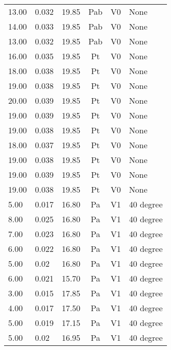 \begin{table}[b!]
\begin{tabular}{l | l | l | c | c | l}
13.00          & 0.032           & 19.85  & Pab      & V0     & None                \\
14.00          & 0.033           & 19.85  & Pab      & V0     & None                \\
13.00          & 0.032           & 19.85  & Pab      & V0     & None                \\
16.00          & 0.035           & 19.85  & Pt       & V0     & None                \\
18.00          & 0.038           & 19.85  & Pt       & V0     & None                \\
19.00          & 0.038           & 19.85  & Pt       & V0     & None                \\
20.00          & 0.039           & 19.85  & Pt       & V0     & None                \\
19.00          & 0.039           & 19.85  & Pt       & V0     & None                \\
19.00          & 0.038           & 19.85  & Pt       & V0     & None                \\
18.00          & 0.037           & 19.85  & Pt       & V0     & None                \\
19.00          & 0.038           & 19.85  & Pt       & V0     & None                \\
19.00          & 0.039           & 19.85  & Pt       & V0     & None                \\
19.00          & 0.038           & 19.85  & Pt       & V0     & None                \\
5.00           & 0.017           & 16.80  & Pa       & V1     & 40 degree           \\
8.00           & 0.025           & 16.80  & Pa       & V1     & 40 degree           \\
7.00           & 0.023           & 16.80  & Pa       & V1     & 40 degree           \\
6.00           & 0.022           & 16.80  & Pa       & V1     & 40 degree           \\
5.00           & 0.02            & 16.80  & Pa       & V1     & 40 degree           \\
6.00           & 0.021           & 15.70  & Pa       & V1     & 40 degree           \\
3.00           & 0.015           & 17.85  & Pa       & V1     & 40 degree           \\
4.00           & 0.017           & 17.50  & Pa       & V1     & 40 degree           \\
5.00           & 0.019           & 17.15  & Pa       & V1     & 40 degree           \\
5.00           & 0.02            & 16.95  & Pa       & V1     & 40 degree           \\
\end{tabular}
\end{table}

